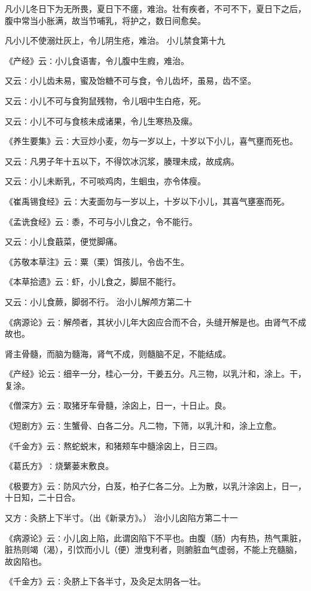 \documentclass[a4paper,12pt,UTF8,twoside]{ctexbook}
\begin{document}
凡小儿冬日下为无所畏，夏日下不瘥，难治。壮有疾者，不可不下，夏日下之后，腹中常当小胀满，故当节哺乳，将护之，数日间愈矣。

凡小儿不使溺灶灰上，令儿阴生疮，难治。
小儿禁食第十九

《产经》云∶小儿食语害，令儿腹中生瘕，难治。

又云∶小儿齿未易，蜜及饴糖不可与食，令儿齿坏，虽易，齿不坚。

又云∶小儿不可与食狗鼠残物，令儿咽中生白疮，死。

又云∶小儿不可与食核未成诸果，令儿生寒热及瘰。

《养生要集》云∶大豆炒小麦，勿与一岁以上，十岁以下小儿，喜气壅而死也。

又云∶凡男子年十五以下，不得饮冰沉浆，腠理未成，故成病。

又云∶小儿未断乳，不可啖鸡肉，生蛔虫，亦令体瘦。

《崔禹锡食经》云∶大麦面勿与一岁以上，十岁以下小儿，其喜气壅塞而死。

《孟诜食经》云∶黍，不可与小儿食之，令不能行。

又云∶小儿食蕺菜，便觉脚痛。

《苏敬本草注》云∶粟（栗）饵孩儿，令齿不生。

《本草拾遗》云∶虾，小儿食之，脚屈不能行。

又云∶小儿食蕨，脚弱不行。
治小儿解颅方第二十

《病源论》云∶解颅者，其状小儿年大囟应合而不合，头缝开解是也。由肾气不成故也。

肾主骨髓，而脑为髓海，肾气不成，则髓脑不足，不能结成。

《产经》论云∶细辛一分，桂心一分，干姜五分。凡三物，以乳汁和，涂上。干，复涂。

《僧深方》云∶取猪牙车骨髓，涂囟上，日一，十日止。良。

《短剧方》云∶生蟹骨、白各二分。凡二物，下筛，以乳汁和，涂上立愈。

《千金方》云∶熬蛇蜕末，和猪颊车中髓涂囟上，日三四。

《葛氏方》∶烧蘩蒌末敷良。

《极要方》云∶防风六分，白芨，柏子仁各二分。上为散，以乳汁涂囟上，日一，十日知，二十日合。

又方∶灸脐上下半寸。（出《新录方》。）
治小儿囟陷方第二十一

《病源论》云∶小儿囟上陷，此谓囟陷下不平也。由腹（肠）内有热，热气熏脏，脏热则竭（渴），引饮而小儿（便）泄曳利者，则腑脏血气虚弱，不能上充髓脑，故囟陷也。

《千金方》云∶灸脐上下各半寸，及灸足太阴各一壮。
\end{document}
